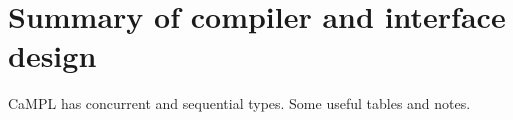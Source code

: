 \documentclass[11pt]{article}
\begin{document}
%
%
%


\iffalse
\section{Summary of compiler and interface design}

CaMPL has concurrent and sequential types. Some useful tables and notes.
\end{document}
